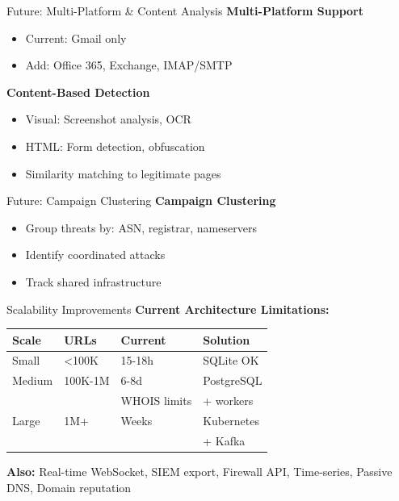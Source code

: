 \documentclass[aspectratio=169]{beamer}
\begin{document}
\begin{frame}{Future: Multi-Platform \& Content Analysis}
\small
\textbf{Multi-Platform Support}
\begin{itemize}
    \item Current: Gmail only
    \item Add: Office 365, Exchange, IMAP/SMTP
\end{itemize}

\vspace{0.2cm}
\textbf{Content-Based Detection}
\begin{itemize}
    \item Visual: Screenshot analysis, OCR
    \item HTML: Form detection, obfuscation
    \item Similarity matching to legitimate pages
\end{itemize}
\end{frame}

\begin{frame}{Future: Campaign Clustering}
\small
\textbf{Campaign Clustering}
\begin{itemize}
    \item Group threats by: ASN, registrar, nameservers
    \item Identify coordinated attacks
    \item Track shared infrastructure
\end{itemize}
\end{frame}

\begin{frame}{Scalability Improvements}
\small
\textbf{Current Architecture Limitations:}
\begin{center}
\scriptsize
\begin{tabular}{llll}
\toprule
\textbf{Scale} & \textbf{URLs} & \textbf{Current} & \textbf{Solution} \\
\midrule
Small & <100K & 15-18h & SQLite OK \\
Medium & 100K-1M & 6-8d & PostgreSQL \\
 & & WHOIS limits & + workers \\
Large & 1M+ & Weeks & Kubernetes \\
 & & & + Kafka \\
\bottomrule
\end{tabular}
\end{center}

\vspace{0.2cm}
\scriptsize
\textbf{Also:} Real-time WebSocket, SIEM export, Firewall API, Time-series, Passive DNS, Domain reputation
\end{frame}
\end{document}
